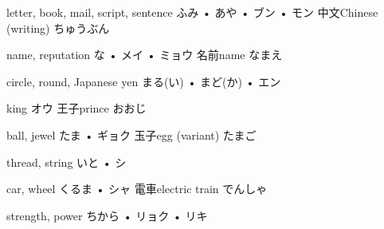 



\setcounter{cardnum}{73}

		{letter, book, mail, script, sentence}
		{ふみ • あや • ブン • モン}
		{中文}{Chinese (writing) ちゅうぶん}
		{}{}
		{}{}
		{}{}
		{}{}

		{name, reputation}
		{な • メイ • ミョウ}
		{名前}{name なまえ}
		{}{}
		{}{}
		{}{}
		{}{}

		{circle, round, Japanese yen}
		{まる(い) • まど(か) • エン}
		{}{}
		{}{}
		{}{}
		{}{}
		{}{}

		{king}
		{オウ}
		{王子}{prince おおじ}
		{}{}
		{}{}
		{}{}
		{}{}

		{ball, jewel}
		{たま • ギョク}
		{玉子}{egg (variant) たまご}
		{}{}
		{}{}
		{}{}
		{}{}

		{thread, string}
		{いと • シ}
		{}{}
		{}{}
		{}{}
		{}{}
		{}{}

		{car, wheel}
		{くるま • シャ}
		{電車}{electric train でんしゃ}
		{}{}
		{}{}
		{}{}
		{}{}

		{strength, power}
		{ちから • リョク • リキ}
		{}{}
		{}{}
		{}{}
		{}{}
		{}{}

